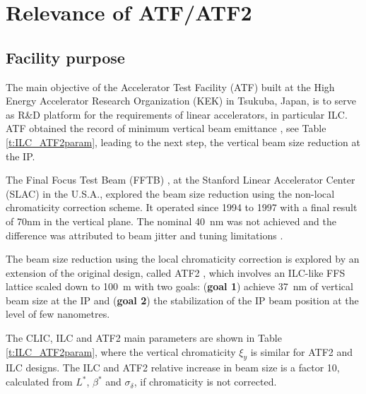 \chapter{Relevance of ATF/ATF2}\label{s:ATF2}

\section{Facility purpose}
The main objective of the Accelerator Test Facility (ATF) built at the High Energy Accelerator Research Organization (KEK) in Tsukuba, Japan, is to serve as R\&D platform for the requirements of linear accelerators, in particular ILC. ATF obtained the record of minimum vertical beam emittance \cite{Kubo:2001ps,PhysRevLett.92.054802}, see Table \ref{t:ILC_ATF2param}, leading to the next step, the vertical beam size reduction at the IP.\par
The Final Focus Test Beam (FFTB) \cite{Berndt:1991ug}, at the Stanford Linear Accelerator Center (SLAC) in the  U.S.A., explored the beam size reduction using the non-local chromaticity correction scheme. It operated since 1994 to 1997 with a final result of 70nm in the vertical plane. The nominal 40~nm was not achieved and the difference was attributed to beam jitter and tuning limitations \cite{Araki1}.\par
The beam size reduction using the local chromaticity correction is explored by an extension of the original design, called ATF2 \cite{ATF2prop,grishanov:in2p3-00309474}, which involves an ILC-like FFS lattice scaled down to 100~m with two goals: (\textbf{goal 1}) achieve 37~nm of vertical beam size at the IP and (\textbf{goal 2}) the stabilization of the IP beam position at the level of few nanometres.\par
The CLIC, ILC and ATF2 main parameters are shown in Table \ref{t:ILC_ATF2param}, where the vertical chromaticity $\xi_y$ is similar for ATF2 and ILC designs. The ILC and ATF2 relative increase in beam size is a factor 10, calculated from $L^*$, $\beta^*$ and $\sigma_\delta$, if chromaticity is not corrected.\par
